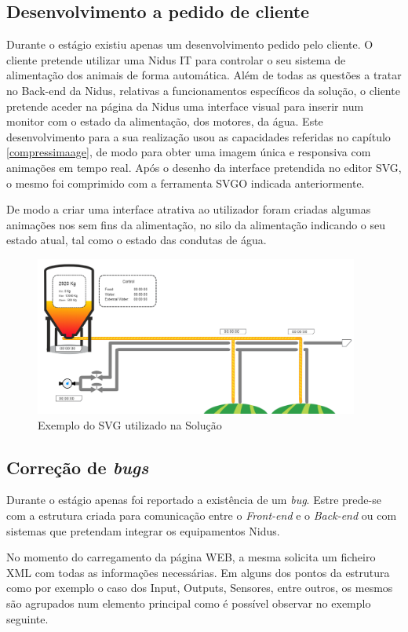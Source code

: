 \subsection{Desenvolvimento a pedido de cliente}

\par Durante o estágio existiu apenas um desenvolvimento pedido pelo cliente. O cliente pretende utilizar uma Nidus IT para controlar o seu sistema de alimentação dos animais de forma automática. Além de todas as questões a tratar no Back-end da Nidus, relativas a funcionamentos específicos da solução, o cliente pretende aceder na página da Nidus uma interface visual para inserir num monitor com o estado da alimentação, dos motores, da água. Este desenvolvimento para a sua realização usou as capacidades referidas no capítulo \ref{compressimaage}, de modo para obter uma imagem única e responsiva com animações em tempo real. Após o desenho da interface pretendida no editor SVG, o mesmo foi comprimido com a ferramenta SVGO indicada anteriormente. \par De modo a criar uma interface atrativa ao utilizador foram criadas algumas animações nos sem fins da alimentação, no silo da alimentação indicando o seu estado atual, tal como o estado das condutas de água.

\begin{figure}[ht]
\centering
\includegraphics[width=0.95\textwidth]{images/svgpig.png}
\caption{Exemplo do SVG utilizado na Solução}\label{pig}
\end{figure}

\subsection{Correção de \textit{bugs}}

\par Durante o estágio apenas foi reportado a existência de um \textit{bug}. Estre prede-se com a estrutura criada para comunicação entre o \textit{Front-end} e o \textit{Back-end} ou com sistemas que pretendam integrar os equipamentos Nidus.
\par No momento do carregamento da página WEB, a mesma solicita um ficheiro XML com todas as informações necessárias. Em alguns dos pontos da estrutura como por exemplo o caso dos Input, Outputs, Sensores, entre outros, os mesmos são agrupados num elemento principal como é possível observar no exemplo seguinte.

